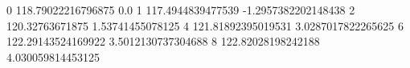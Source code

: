 0 118.79022216796875 0.0
1 117.4944839477539 -1.2957382202148438
2 120.32763671875 1.53741455078125
4 121.81892395019531 3.0287017822265625
6 122.29143524169922 3.5012130737304688
8 122.82028198242188 4.030059814453125
